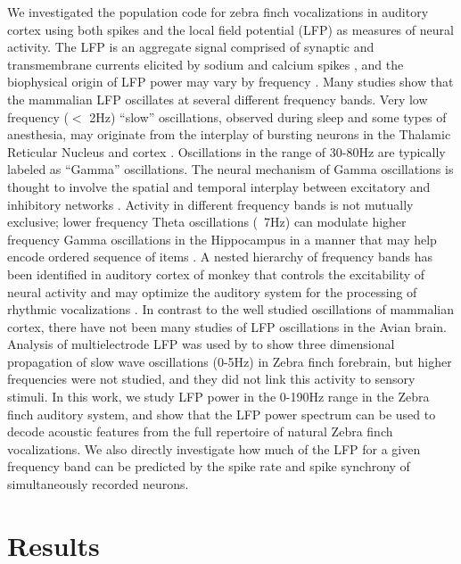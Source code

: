 We investigated the population code for zebra finch vocalizations in auditory cortex using both spikes and the local field potential (LFP) as measures of neural activity. The LFP is an aggregate signal comprised of synaptic and transmembrane currents elicited by sodium and calcium spikes \cite{Buzsaki2012b}, and the biophysical origin of LFP power may vary by frequency \cite{Reimann2013}. Many studies show that the mammalian LFP oscillates at several different frequency bands. Very low frequency ($<$ 2Hz) “slow” oscillations, observed during sleep and some types of anesthesia, may originate from the interplay of bursting neurons in the Thalamic Reticular Nucleus and cortex \cite{Lewis2015}. Oscillations in the range of 30-80Hz are typically labeled as “Gamma” oscillations. The neural mechanism of Gamma oscillations is thought to involve the spatial and temporal interplay between excitatory and inhibitory networks \cite{Buzsaki2012a}. Activity in different frequency bands is not mutually exclusive; lower frequency Theta oscillations (~7Hz) can modulate higher frequency Gamma oscillations in the Hippocampus in a manner that may help encode ordered sequence of items \cite{Lisman2013}. A nested hierarchy of frequency bands has been identified in auditory cortex of monkey that controls the excitability of neural activity and may optimize the auditory system for the processing of rhythmic vocalizations \cite{Lakatos2005}. In contrast to the well studied oscillations of mammalian cortex, there have not been many studies of LFP oscillations in the Avian brain. Analysis of multielectrode LFP was used by \cite{Beckers2014} to show three dimensional propagation of slow wave oscillations (0-5Hz) in Zebra finch forebrain, but higher frequencies were not studied, and they did not link this activity to sensory stimuli. In this work, we study LFP power in the 0-190Hz range in the Zebra finch auditory system, and show that the LFP power spectrum can be used to decode acoustic features from the full repertoire of natural Zebra finch vocalizations. We also directly investigate how much of the LFP for a given frequency band can be predicted by the spike rate and spike synchrony of simultaneously recorded neurons.

\section{Results}

